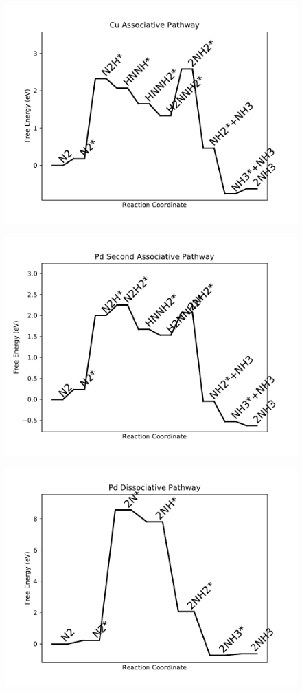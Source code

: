 \begin{figure}
\includegraphics[width=0.8\linewidth]{data/plots/Cu_associative.pdf}
\label{fig:Cu_associative}
\end{figure}

\begin{figure}
\includegraphics[width=0.8\linewidth]{data/plots/Pd_associative_2.pdf}
\label{fig:Pd_associative_2}
\end{figure}

\begin{figure}
\includegraphics[width=0.8\linewidth]{data/plots/Pd_dissociative.pdf}
\label{fig:Pd_dissociative}
\end{figure}

